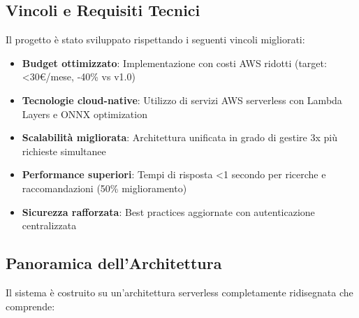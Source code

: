 \documentclass[11pt,a4paper]{article}
\begin{document}
\subsection{Vincoli e Requisiti Tecnici}
Il progetto è stato sviluppato rispettando i seguenti vincoli migliorati:
\begin{itemize}
  \item \textbf{Budget ottimizzato}: Implementazione con costi AWS ridotti (target: <30€/mese, -40\% vs v1.0)
  \item \textbf{Tecnologie cloud-native}: Utilizzo di servizi AWS serverless con Lambda Layers e ONNX optimization
  \item \textbf{Scalabilità migliorata}: Architettura unificata in grado di gestire 3x più richieste simultanee
  \item \textbf{Performance superiori}: Tempi di risposta <1 secondo per ricerche e raccomandazioni (50\% miglioramento)
  \item \textbf{Sicurezza rafforzata}: Best practices aggiornate con autenticazione centralizzata
\end{itemize}

\subsection{Panoramica dell'Architettura}
Il sistema è costruito su un'architettura serverless completamente ridisegnata che comprende:
\end{document}
